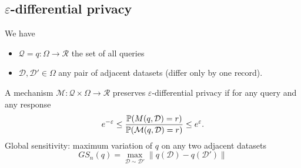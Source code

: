 \documentclass[a4paper,9pt]{extarticle}
\begin{document}
\begin{multicols*}{2}
\subsection{$\varepsilon$-differential privacy}
We have
\begin{itemize}
	\item $\mathcal{Q}=q:\Omega\to\mathcal{R}$ the set of all queries
	\item $\mathcal{D},\mathcal{D}'\in\Omega$ any pair of adjacent datasets (differ only by one record).
\end{itemize}
A mechanism $\mathcal{M}:\mathcal{Q}\times\Omega\to\mathcal{R}$ preserves $\varepsilon$-differential privacy if for any query and any response
\begin{equation*}
	e^{-\varepsilon}\leq\frac{\mathbb{P}(M(q,\mathcal{D})=r)}{\mathbb{P}(\mathcal{M}(q,\mathcal{D})=r)}\leq e^{\varepsilon}.
\end{equation*}
Global sensitivity: maximum variation of $q$ on any two adjacent datasets
\begin{equation*}
	GS_{n}(q)=\max_{\mathcal{D}\sim\mathcal{D}'}\lVert q(\mathcal{D})-q(\mathcal{D}')\rVert
\end{equation*}
\end{multicols*}
\end{document}
